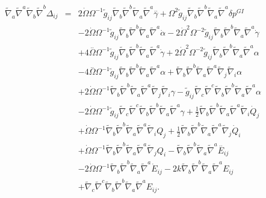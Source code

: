\begin{eqnarray}
\nonumber\\  \\ 
\tilde\nabla_a\tilde\nabla^a \tilde\nabla_b\tilde\nabla^b \Delta_{ij}&=& 2 \dot{\Omega} \Omega^{-1} \tilde{g}_{ij} \tilde{\nabla}_{b}\tilde{\nabla}^{b}\tilde{\nabla}_{a}\tilde{\nabla}^{a}\overset{..}{\gamma} + \Omega^2 \tilde{g}_{ij} \tilde{\nabla}_{b}\tilde{\nabla}^{b}\tilde{\nabla}_{a}\tilde{\nabla}^{a}\delta p^{GI}{} 
\nonumber\\
&&- 2 \dot{\Omega} \Omega^{-1} \tilde{g}_{ij} \tilde{\nabla}_{b}\tilde{\nabla}^{b}\tilde{\nabla}_{a}\tilde{\nabla}^{a}\dot{\alpha}  - 2 \dot{\Omega}^2 \Omega^{-2} \tilde{g}_{ij} \tilde{\nabla}_{b}\tilde{\nabla}^{b}\tilde{\nabla}_{a}\tilde{\nabla}^{a}\dot{\gamma} 
\nonumber\\
&&+ 4 \overset{..}{\Omega} \Omega^{-1} \tilde{g}_{ij} \tilde{\nabla}_{b}\tilde{\nabla}^{b}\tilde{\nabla}_{a}\tilde{\nabla}^{a}\dot{\gamma} + 2 \dot{\Omega}^2 \Omega^{-2} \tilde{g}_{ij} \tilde{\nabla}_{b}\tilde{\nabla}^{b}\tilde{\nabla}_{a}\tilde{\nabla}^{a}\alpha  
\nonumber\\
&&- 4 \overset{..}{\Omega} \Omega^{-1} \tilde{g}_{ij} \tilde{\nabla}_{b}\tilde{\nabla}^{b}\tilde{\nabla}_{a}\tilde{\nabla}^{a}\alpha + \tilde{\nabla}_{b}\tilde{\nabla}^{b}\tilde{\nabla}_{a}\tilde{\nabla}^{a}\tilde{\nabla}_{j}\tilde{\nabla}_{i}\alpha 
\nonumber\\
&&+ 2 \dot{\Omega} \Omega^{-1} \tilde{\nabla}_{b}\tilde{\nabla}^{b}\tilde{\nabla}_{a}\tilde{\nabla}^{a}\tilde{\nabla}_{j}\tilde{\nabla}_{i}\gamma  -  \tilde{g}_{ij} \tilde{\nabla}_{c}\tilde{\nabla}^{c}\tilde{\nabla}_{b}\tilde{\nabla}^{b}\tilde{\nabla}_{a}\tilde{\nabla}^{a}\alpha 
\nonumber\\
&&- 2 \dot{\Omega} \Omega^{-1} \tilde{g}_{ij} \tilde{\nabla}_{c}\tilde{\nabla}^{c}\tilde{\nabla}_{b}\tilde{\nabla}^{b}\tilde{\nabla}_{a}\tilde{\nabla}^{a}\gamma +\tfrac{1}{2} \tilde{\nabla}_{b}\tilde{\nabla}^{b}\tilde{\nabla}_{a}\tilde{\nabla}^{a}\tilde{\nabla}_{i}\dot{Q}_{j} \nonumber \\ 
&& + \dot{\Omega} \Omega^{-1} \tilde{\nabla}_{b}\tilde{\nabla}^{b}\tilde{\nabla}_{a}\tilde{\nabla}^{a}\tilde{\nabla}_{i}Q_{j} + \tfrac{1}{2} \tilde{\nabla}_{b}\tilde{\nabla}^{b}\tilde{\nabla}_{a}\tilde{\nabla}^{a}\tilde{\nabla}_{j}\dot{Q}_{i} 
\nonumber\\
&&+ \dot{\Omega} \Omega^{-1} \tilde{\nabla}_{b}\tilde{\nabla}^{b}\tilde{\nabla}_{a}\tilde{\nabla}^{a}\tilde{\nabla}_{j}Q_{i}- \tilde{\nabla}_{b}\tilde{\nabla}^{b}\tilde{\nabla}_{a}\tilde{\nabla}^{a}\overset{..}{E}_{ij} \nonumber \\ 
&& - 2 \dot{\Omega} \Omega^{-1} \tilde{\nabla}_{b}\tilde{\nabla}^{b}\tilde{\nabla}_{a}\tilde{\nabla}^{a}\dot{E}_{ij} - 2 k \tilde{\nabla}_{b}\tilde{\nabla}^{b}\tilde{\nabla}_{a}\tilde{\nabla}^{a}E_{ij} 
\nonumber\\
&&+ \tilde{\nabla}_{c}\tilde{\nabla}^{c}\tilde{\nabla}_{b}\tilde{\nabla}^{b}\tilde{\nabla}_{a}\tilde{\nabla}^{a}E_{ij}.
\end{eqnarray}
